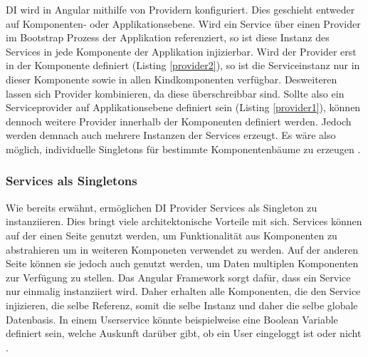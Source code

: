 \ac{DI} wird in Angular mithilfe von Providern konfiguriert.
Dies geschieht entweder auf Komponenten- oder Applikationsebene.
Wird ein Service über einen Provider im Bootstrap Prozess der Applikation referenziert,
so ist diese Instanz des Services in jede Komponente der Applikation injizierbar.
Wird der Provider erst in der Komponente definiert (Listing \ref{provider2}), so ist die Serviceinstanz nur in dieser Komponente sowie in
allen Kindkomponenten verfügbar. Desweiteren lassen sich Provider kombinieren, da diese überschreibbar sind.
Sollte also ein Serviceprovider auf Applikationsebene definiert sein (Listing \ref{provider1}), können dennoch weitere Provider innerhalb der Komponenten definiert werden.
Jedoch werden demnach auch mehrere Instanzen der Services erzeugt.
Es wäre also möglich, individuelle Singletons für bestimmte Komponentenbäume zu erzeugen \cite[286]{Angular2}.

\vspace{0.2cm}

\vspace{0.2cm}

\vspace{0.2cm}

\vspace{0.2cm}


\subsubsection{Services als Singletons}
\label{Services-als-Singletons}

Wie bereits erwähnt, ermöglichen \ac{DI} Provider Services als Singleton zu instanziieren.
Dies bringt viele architektonische Vorteile mit sich. Services können auf der einen Seite genutzt werden,
um Funktionalität aus Komponenten zu abstrahieren um in weiteren Komponeten verwendet zu werden.
Auf der anderen Seite können sie jedoch auch genutzt werden, um Daten multiplen Komponenten zur Verfügung zu stellen.
Das Angular Framework sorgt dafür, dass ein Service nur einmalig instanziiert wird. Daher erhalten alle
Komponenten, die den Service injizieren, die selbe Referenz, somit die selbe Instanz und daher die selbe globale Datenbasis.
In einem Userservice könnte beispielweise eine Boolean Variable definiert sein, welche Auskunft darüber gibt,
ob ein User eingeloggt ist oder nicht \cite[308]{Angular2}.


